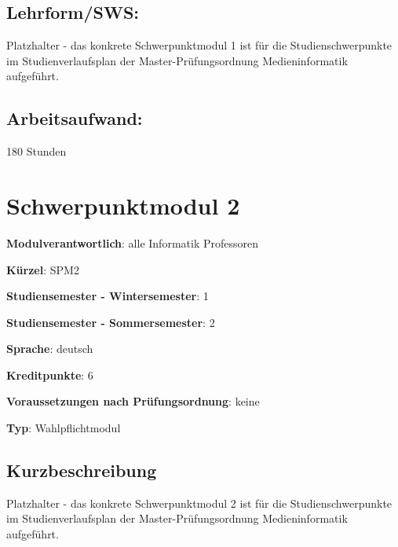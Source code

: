 \section*{Lehrform/SWS:}\label{lehrformsws-3}

Platzhalter - das konkrete Schwerpunktmodul 1 ist für die
Studienschwerpunkte im Studienverlaufsplan der Master-Prüfungsordnung
Medieninformatik aufgeführt.

\section*{Arbeitsaufwand:}\label{arbeitsaufwand-3}

180 Stunden

\chapter{Schwerpunktmodul 2}\label{schwerpunktmodul-2}

\begin{modulHead}
\textbf{Modulverantwortlich}: alle Informatik
Professoren
\end{modulHead}
\begin{modulHead}
\textbf{Kürzel}:
SPM2
\end{modulHead}
\begin{modulHead}
\textbf{Studiensemester -
Wintersemester}:
1
\end{modulHead}
\begin{modulHead}
\textbf{Studiensemester -
Sommersemester}: 2
\end{modulHead}
\begin{modulHead}
\textbf{Sprache}:
deutsch
\end{modulHead}
\begin{modulHead}
\textbf{Kreditpunkte}:
6
\end{modulHead}
\begin{modulHead}
\textbf{Voraussetzungen nach
Prüfungsordnung}: keine
\end{modulHead}
\begin{modulHead}
\textbf{Typ}:
Wahlpflichtmodul
\end{modulHead}


\section*{Kurzbeschreibung}\label{kurzbeschreibung-2}

Platzhalter - das konkrete Schwerpunktmodul 2 ist für die
Studienschwerpunkte im Studienverlaufsplan der Master-Prüfungsordnung
Medieninformatik aufgeführt.

